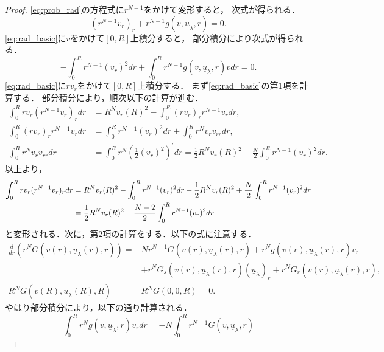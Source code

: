 \begin{proof}
 \eqref{eq:prob_rad}の方程式に$r^{N-1}$をかけて変形すると，
 次式が得られる．
 \begin{equation}
  (r^{N-1} v_r)_r + r^{N-1} g(v, \underline{u}_\lambda, r) = 0.
   \label{eq:rad_basic} 
 \end{equation}
 \eqref{eq:rad_basic}に$v$をかけて$[0, R]$上積分すると，
 部分積分により次式が得られる．
 \begin{equation}
  - \int_0^R r^{N-1} (v_r)^2 dr + \int_0^R r^{N-1} g(v,
   \underline{u}_\lambda, r) v dr = 0.  \label{eq:poh_times_v}
 \end{equation}
 \eqref{eq:rad_basic}に$rv_r$をかけて$[0, R]$上積分する．
 まず\eqref{eq:rad_basic}の第$1$項を計算する．
 部分積分により，順次以下の計算が進む．
 \begin{align*}
  \int_0^R r v_r (r^{N-1} v_r)_r dr &= R^N v_r(R)^2 - \int_0^R
  (rv_r)_r r^{N-1} v_r dr, \\
  \int_0^R (rv_r)_r r^{N-1} v_r dr &= \int_0^R r^{N-1} (v_r)^2 dr +
  \int_0^R r^N v_r v_{rr} dr, \\
  \int_0^R r^N v_r v_{rr} dr &= \int_0^R r^N \left( \frac{1}{2}
  (v_r)^2 \right)^\prime dr = \frac{1}{2} R^N v_r(R)^2 - \frac{N}{2}
  \int_0^R r^{N-1} (v_r)^2 dr.
 \end{align*}
 以上より，
 \begin{align}
  \int_0^R r v_r (r^{N-1} v_r)_r dr &= R^N v_r(R)^2 - 
  \int_0^R r^{N-1} (v_r)^2 dr - \frac{1}{2} R^N v_r(R)^2 + \frac{N}{2}
  \int_0^R r^{N-1} (v_r)^2 dr \notag \\ 
  &= \frac{1}{2} R^N v_r(R)^2 + \frac{N-2}{2}\int_0^R r^{N-1} (v_r)^2
  dr \label{eq:poh_times_rvr_1}
 \end{align}
 と変形される．次に，第$2$項の計算をする．以下の式に注意する．
 \begin{align*}
  \frac{d}{dr} \left( r^N G(v(r), \underline{u}_\lambda(r), r )
  \right) =& N r^{N-1} G( v(r), \underline{u}_\lambda(r), r) + r^N g(
  v(r), \underline{u}_\lambda(r), r) v_r \\ &+ r^N G_s(v(r),
  \underline{u}_\lambda(r), r) (\underline{u}_\lambda)_r
  + r^N G_r(v(r), \underline{u}_\lambda(r),
  r), \\
  R^N G(v(R), \underline{u}_\lambda(R), R) =& R^N G(0, 0, R) = 0. 
 \end{align*}
 やはり部分積分により，以下の通り計算される．
 \begin{equation}
  \int_0^R r^N g(v, \underline{u}_\lambda, r) v_r dr
   = -N \int_0^R r^{N-1} G(v, \underline{u}_\lambda, r)

\end{equation}
\end{proof}
